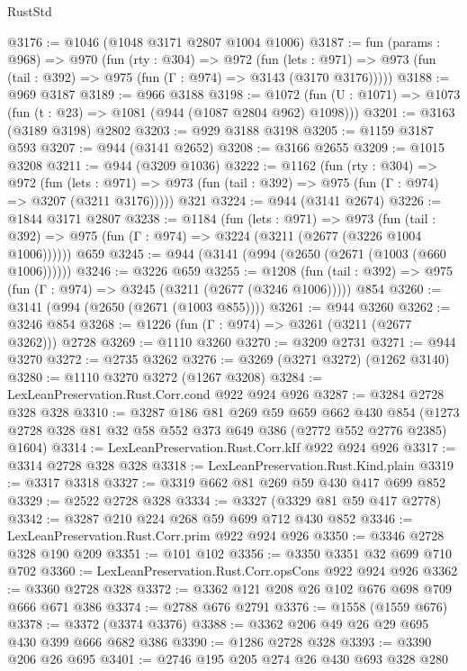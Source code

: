 \begin{lexlean}{RustStd}
\begin{coremodule}
{\begin{coremodule}
{{{{{{{{{{@3176 := @1046 (@1048 @3171 @2807 @1004 @1006)
@3187 := fun (params : @968) =>
  @970
    (fun (rty : @304) =>
    @972
      (fun (lets : @971) =>
      @973 (fun (tail : @392) => @975 (fun (Γ : @974) => @3143 (@3170 @3176)))))
@3188 := @969 @3187
@3189 := @966 @3188
@3198 := @1072 (fun (U : @1071) => @1073 (fun (t : @23) => @1081 (@944 (@1087 @2804 @962) @1098)))
@3201 := @3163 (@3189 @3198) @2802
@3203 := @929 @3188 @3198
@3205 := @1159 @3187 @593
@3207 := @944 (@3141 @2652)
@3208 := @3166 @2655
@3209 := @1015 @3208
@3211 := @944 (@3209 @1036)
@3222 := @1162
    (fun (rty : @304) =>
    @972
      (fun (lets : @971) =>
      @973 (fun (tail : @392) => @975 (fun (Γ : @974) => @3207 (@3211 @3176)))))
    @321
@3224 := @944 (@3141 @2674)
@3226 := @1844 @3171 @2807
@3238 := @1184
    (fun (lets : @971) =>
    @973 (fun (tail : @392) => @975 (fun (Γ : @974) => @3224 (@3211 (@2677 (@3226 @1004 @1006))))))
    @659
@3245 := @944 (@3141 (@994 (@2650 (@2671 (@1003 (@660 @1006))))))
@3246 := @3226 @659
@3255 := @1208
    (fun (tail : @392) => @975 (fun (Γ : @974) => @3245 (@3211 (@2677 (@3246 @1006)))))
    @854
@3260 := @3141 (@994 (@2650 (@2671 (@1003 @855))))
@3261 := @944 @3260
@3262 := @3246 @854
@3268 := @1226 (fun (Γ : @974) => @3261 (@3211 (@2677 @3262))) @2728
@3269 := @1110 @3260
@3270 := @3209 @2731
@3271 := @944 @3270
@3272 := @2735 @3262
@3276 := @3269 (@3271 @3272) (@1262 @3140)
@3280 := @1110 @3270 @3272 (@1267 @3208)
@3284 := LexLeanPreservation.Rust.Corr.cond @922 @924 @926
@3287 := @3284 @2728 @328 @328
@3310 := @3287
    @186
    @81
    @269
    @59
    @659
    @662
    @430
    @854
    (@1273 @2728 @328 @81 @32 @58 @552 @373 @649 @386 (@2772 @552 @2776 @2385) @1604)
@3314 := LexLeanPreservation.Rust.Corr.kIf @922 @924 @926
@3317 := @3314 @2728 @328 @328
@3318 := LexLeanPreservation.Rust.Kind.plain
@3319 := @3317 @3318
@3327 := @3319 @662 @81 @269 @59 @430 @417 @699 @852
@3329 := @2522 @2728 @328
@3334 := @3327 (@3329 @81 @59 @417 @2778)
@3342 := @3287 @210 @224 @268 @59 @699 @712 @430 @852
@3346 := LexLeanPreservation.Rust.Corr.prim @922 @924 @926
@3350 := @3346 @2728 @328 @190 @209
@3351 := @101 @102
@3356 := @3350 @3351 @32 @699 @710 @702
@3360 := LexLeanPreservation.Rust.Corr.opsCons @922 @924 @926
@3362 := @3360 @2728 @328
@3372 := @3362 @121 @208 @26 @102 @676 @698 @709 @666 @671 @386
@3374 := @2788 @676 @2791
@3376 := @1558 (@1559 @676)
@3378 := @3372 (@3374 @3376)
@3388 := @3362 @206 @49 @26 @29 @695 @430 @399 @666 @682 @386
@3390 := @1286 @2728 @328
@3393 := @3390 @206 @26 @695
@3401 := @2746 @195 @205 @274 @26 @430 @693 @328 @280
}}}}}}}}}}
\end{coremodule}}
\end{coremodule}
\end{lexlean}
